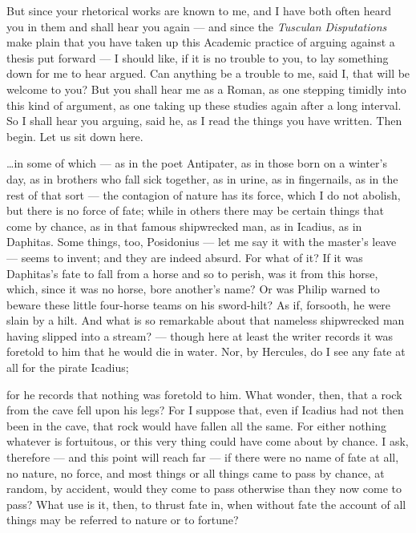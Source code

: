  But since your rhetorical works are known to me, and I have both often heard you in them and shall hear you again — and since the \textit{Tusculan Disputations} make plain that you have taken up this Academic practice of arguing against a thesis put forward — I should like, if it is no trouble to you, to lay something down for me to hear argued. Can anything be a trouble to me, said I, that will be welcome to you? But you shall hear me as a Roman, as one stepping timidly into this kind of argument, as one taking up these studies again after a long interval. So I shall hear you arguing, said he, as I read the things you have written. Then begin. Let us sit down here.

 \dots in some of which — as in the poet Antipater, as in those born on a winter's day, as in brothers who fall sick together, as in urine, as in fingernails, as in the rest of that sort — the contagion of nature has its force, which I do not abolish, but there is no force of fate; while in others there may be certain things that come by chance, as in that famous shipwrecked man, as in Icadius, as in Daphitas. Some things, too, Posidonius — let me say it with the master's leave — seems to invent; and they are indeed absurd. For what of it? If it was Daphitas's fate to fall from a horse and so to perish, was it from this horse, which, since it was no horse, bore another's name? Or was Philip warned to beware these little four-horse teams on his sword-hilt? As if, forsooth, he were slain by a hilt. And what is so remarkable about that nameless shipwrecked man having slipped into a stream? — though here at least the writer records it was foretold to him that he would die in water. Nor, by Hercules, do I see any fate at all for the pirate Icadius;

 for he records that nothing was foretold to him. What wonder, then, that a rock from the cave fell upon his legs? For I suppose that, even if Icadius had not then been in the cave, that rock would have fallen all the same. For either nothing whatever is fortuitous, or this very thing could have come about by chance. I ask, therefore — and this point will reach far — if there were no name of fate at all, no nature, no force, and most things or all things came to pass by chance, at random, by accident, would they come to pass otherwise than they now come to pass? What use is it, then, to thrust fate in, when without fate the account of all things may be referred to nature or to fortune?

